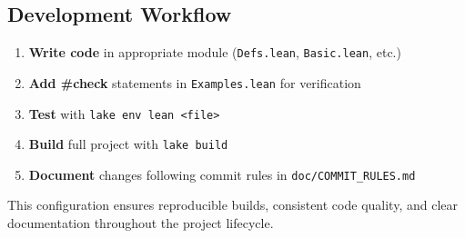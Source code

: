 \documentclass[
  12pt, %
]{assignment}
\begin{document}
\subsection{Development Workflow}
\begin{enumerate}
	\item \textbf{Write code} in appropriate module (\texttt{Defs.lean}, \texttt{Basic.lean}, etc.)
	\item \textbf{Add \#check} statements in \texttt{Examples.lean} for verification
	\item \textbf{Test} with \texttt{lake env lean <file>}
	\item \textbf{Build} full project with \texttt{lake build}
	\item \textbf{Document} changes following commit rules in \texttt{doc/COMMIT\_RULES.md}
\end{enumerate}



This configuration ensures reproducible builds, consistent code quality, and clear documentation throughout the project lifecycle.
\end{document}
